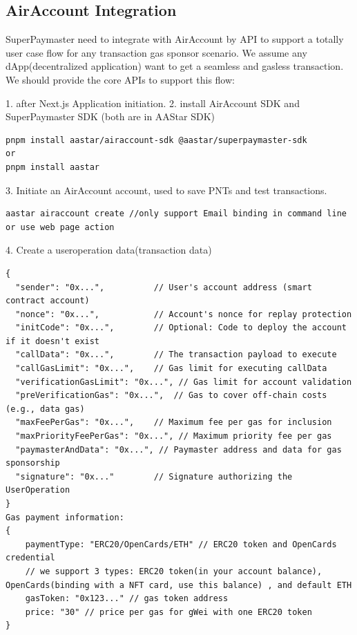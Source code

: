 \documentclass[preprint,12pt]{elsarticle}
\begin{document}
\subsection{AirAccount Integration}
\label{subsec:airaccount-integration}

SuperPaymaster need to integrate with AirAccount by API to support a totally user case flow for any transaction gas sponsor scenario. We assume any dApp(decentralized application) want to get a seamless and gasless transaction. We should provide the core APIs to support this flow:

1. after Next.js Application initiation.
2. install AirAccount SDK and SuperPaymaster SDK (both are in AAStar SDK)

\begin{verbatim}
pnpm install aastar/airaccount-sdk @aastar/superpaymaster-sdk
or 
pnpm install aastar
\end{verbatim}

3. Initiate an AirAccount account, used to save PNTs and test transactions.

\begin{verbatim}
aastar airaccount create //only support Email binding in command line
or use web page action
\end{verbatim}

4. Create a useroperation data(transaction data)

\begin{verbatim}
{  
  "sender": "0x...",          // User's account address (smart contract account)  
  "nonce": "0x...",           // Account's nonce for replay protection  
  "initCode": "0x...",        // Optional: Code to deploy the account if it doesn't exist  
  "callData": "0x...",        // The transaction payload to execute  
  "callGasLimit": "0x...",    // Gas limit for executing callData  
  "verificationGasLimit": "0x...", // Gas limit for account validation  
  "preVerificationGas": "0x...",  // Gas to cover off-chain costs (e.g., data gas)  
  "maxFeePerGas": "0x...",    // Maximum fee per gas for inclusion  
  "maxPriorityFeePerGas": "0x...", // Maximum priority fee per gas  
  "paymasterAndData": "0x...", // Paymaster address and data for gas sponsorship  
  "signature": "0x..."        // Signature authorizing the UserOperation  
}  
Gas payment information:
{
    paymentType: "ERC20/OpenCards/ETH" // ERC20 token and OpenCards credential
    // we support 3 types: ERC20 token(in your account balance), OpenCards(binding with a NFT card, use this balance) , and default ETH
    gasToken: "0x123..." // gas token address
    price: "30" // price per gas for gWei with one ERC20 token
}
\end{verbatim}
\end{document}
